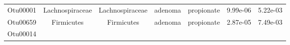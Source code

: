 \documentclass[11pt,]{article}
\begin{document}
\begin{longtable}[]{@{}ccccccc@{}}
\begin{minipage}[t]{0.09\columnwidth}\centering\strut
Otu00001\strut
\end{minipage} & \begin{minipage}[t]{0.17\columnwidth}\centering\strut
Lachnospiraceae\strut
\end{minipage} & \begin{minipage}[t]{0.17\columnwidth}\centering\strut
Lachnospiraceae\strut
\end{minipage} & \begin{minipage}[t]{0.09\columnwidth}\centering\strut
adenoma\strut
\end{minipage} & \begin{minipage}[t]{0.11\columnwidth}\centering\strut
propionate\strut
\end{minipage} & \begin{minipage}[t]{0.09\columnwidth}\centering\strut
9.99e-06\strut
\end{minipage} & \begin{minipage}[t]{0.09\columnwidth}\centering\strut
5.22e-03\strut
\end{minipage}\tabularnewline
\begin{minipage}[t]{0.09\columnwidth}\centering\strut
Otu00659\strut
\end{minipage} & \begin{minipage}[t]{0.17\columnwidth}\centering\strut
Firmicutes\strut
\end{minipage} & \begin{minipage}[t]{0.17\columnwidth}\centering\strut
Firmicutes\strut
\end{minipage} & \begin{minipage}[t]{0.09\columnwidth}\centering\strut
adenoma\strut
\end{minipage} & \begin{minipage}[t]{0.11\columnwidth}\centering\strut
propionate\strut
\end{minipage} & \begin{minipage}[t]{0.09\columnwidth}\centering\strut
2.87e-05\strut
\end{minipage} & \begin{minipage}[t]{0.09\columnwidth}\centering\strut
7.49e-03\strut
\end{minipage}\tabularnewline
\begin{minipage}[t]{0.09\columnwidth}\centering\strut
Otu00014\strut
\end{minipage} & \begin{minipage}[t]{0.17\columnwidth}\centering\strut

\end{minipage}
\end{longtable}
\end{document}
